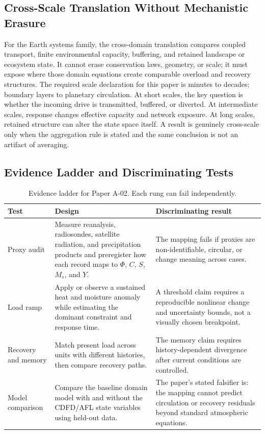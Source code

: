 \documentclass[12pt,a4paper]{article}
\begin{document}
\subsection{Cross-Scale Translation Without Mechanistic Erasure}

For the Earth systems family, the cross-domain translation compares coupled transport, finite environmental capacity, buffering, and retained landscape or ecosystem state. It cannot erase conservation laws, geometry, or scale; it must expose where those domain equations create comparable overload and recovery structures. \cite{Holling1973,Turing1952,BakTangWiesenfeld1987}
The required scale declaration for this paper is minutes to decades; boundary layers to planetary circulation. At short
scales, the key question is whether the incoming drive is transmitted,
buffered, or diverted. At intermediate scales, response changes effective
capacity and network exposure. At long scales, retained structure can alter the
state space itself. A result is genuinely cross-scale only when the aggregation
rule is stated and the same conclusion is not an artifact of averaging.

\subsection{Evidence Ladder and Discriminating Tests}

\begin{table}[htbp]
\centering
\small
\caption{Evidence ladder for Paper A-02. Each rung can fail independently.}
\begin{tabularx}{\textwidth}{|p{}|X|X|}
\hline
\textbf{Test} & \textbf{Design} & \textbf{Discriminating result} \\
\hline
Proxy audit & Measure reanalysis, radiosondes, satellite radiation, and precipitation products and preregister how each record maps to $\Phi$, $C$, $S$, $M_s$, and $Y$. & The mapping fails if proxies are non-identifiable, circular, or change meaning across cases. \\
\hline
Load ramp & Apply or observe a sustained heat and moisture anomaly while estimating the dominant constraint and response time. & A threshold claim requires a reproducible nonlinear change and uncertainty bounds, not a visually chosen breakpoint. \\
\hline
Recovery and memory & Match present load across units with different histories, then compare recovery paths. & The memory claim requires history-dependent divergence after current conditions are controlled. \\
\hline
Model comparison & Compare the baseline domain model with and without the CDFD/AFL state variables using held-out data. & The paper's stated falsifier is: the mapping cannot predict circulation or recovery residuals beyond standard atmospheric equations. \\
\hline
\end{tabularx}
\end{table}
\end{document}
